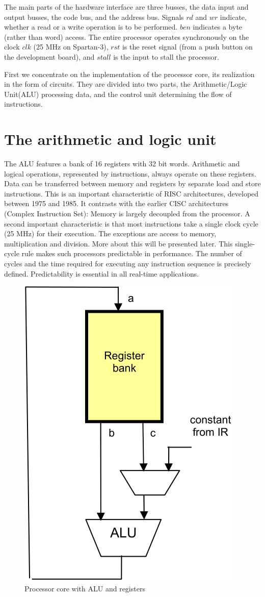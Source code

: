 The main parts of the hardware interface are three busses, the data input and output busses, the
code bus, and the address bus. Signals $rd$ and $wr$ indicate, whether a read or a write operation is to
be performed. $ben$ indicates a byte (rather than word) access. The entire processor operates
synchronously on the clock $clk$ (25 MHz on Spartan-3), $rst$ is the reset signal (from a push button on
the development board), and $stall$ is the input to stall the processor.

First we concentrate on the implementation of the processor core, its realization in the form of
circuits. They are divided into two parts, the Arithmetic/Logic Unit(ALU) processing data, and the control
unit determining the flow of instructions.

\section{The arithmetic and logic unit}
The ALU features a bank of 16 registers with 32 bit words. Arithmetic and logical operations,
represented by instructions, always operate on these registers. Data can be transferred between
memory and registers by separate load and store instructions. This is an important characteristic of
RISC architectures, developed between 1975 and 1985. It contrasts with the earlier CISC
architectures (Complex Instruction Set): Memory is largely decoupled from the processor. A second
important characteristic is that most instructions take a single clock cycle (25 MHz) for their
execution. The exceptions are access to memory, multiplication and division. More about this will be
presented later. This single-cycle rule makes such processors predictable in performance. The
number of cycles and the time required for executing any instruction sequence is precisely defined.
Predictability is essential in all real-time applications.

\begin{figure}[h!]
	\centering
	\includegraphics[width=.5\textwidth]{i/F/2.png}
	\caption{Processor core with ALU and registers}
	\label{fig:alu}
\end{figure}

